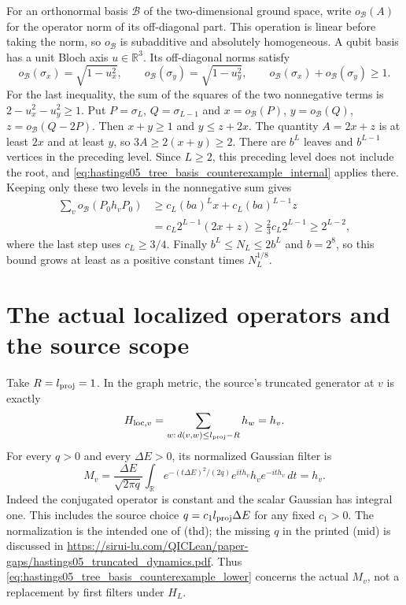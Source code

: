 \documentclass{article}
\begin{document}
For an orthonormal basis $\mathcal B$ of the two-dimensional ground space,
write $o_{\mathcal B}(A)$ for the operator norm of its off-diagonal part.
This operation is linear before taking the norm, so $o_{\mathcal B}$ is
subadditive and absolutely homogeneous. A qubit basis has a unit Bloch
axis $u\in\mathbb R^3$. Its off-diagonal norms satisfy
\[
 o_{\mathcal B}(\sigma_x)=\sqrt{1-u_x^2},\qquad
 o_{\mathcal B}(\sigma_y)=\sqrt{1-u_y^2},\qquad
 o_{\mathcal B}(\sigma_x)+o_{\mathcal B}(\sigma_y)\ge1.
\]
For the last inequality, the sum of the squares of the two nonnegative
terms is $2-u_x^2-u_y^2\ge1$.
Put $P=\sigma_L$, $Q=\sigma_{L-1}$ and
$x=o_{\mathcal B}(P)$, $y=o_{\mathcal B}(Q)$,
$z=o_{\mathcal B}(Q-2P)$. Then $x+y\ge1$ and $y\le z+2x$.
The quantity $A=2x+z$ is at least $2x$ and at least $y$, so
$3A\ge2(x+y)\ge2$.
There are $b^L$ leaves and $b^{L-1}$ vertices in the preceding level.
Since $L\ge2$, this preceding level does not include the root, and
\eqref{eq:hastings05_tree_basis_counterexample_internal} applies there.
Keeping only these two levels in the nonnegative sum gives
\begin{align*}
 \sum_v o_{\mathcal B}(P_0h_vP_0)
 &\ge c_L(ba)^Lx+c_L(ba)^{L-1}z\\
 &=c_L2^{L-1}(2x+z)
 \ge\frac23c_L2^{L-1}\ge2^{L-2},
\end{align*}
where the last step uses $c_L\ge3/4$.
Finally $b^L\le N_L\le2b^L$ and $b=2^8$, so this bound grows at least
as a positive constant times $N_L^{1/8}$.

\section{The actual localized operators and the source scope}

Take $R=l_{\rm proj}=1$. In the graph metric, the source's truncated
generator at $v$ is exactly
\[
 H_{{\rm loc},v}=\sum_{w:\,d(v,w)\le l_{\rm proj}-R}h_w=h_v.
\]
For every $q>0$ and every $\Delta E>0$, its normalized Gaussian filter is
\[
 M_v=\frac{\Delta E}{\sqrt{2\pi q}}
       \int_{\mathbb R}e^{-(t\Delta E)^2/(2q)}
           e^{ith_v}h_ve^{-ith_v}\,dt=h_v.
\]
Indeed the conjugated operator is constant and the scalar Gaussian has
integral one. This includes the source choice $q=c_1l_{\rm proj}\Delta E$
for any fixed $c_1>0$. The normalization is the intended one of (thd);
the missing $q$ in the printed (mid) is discussed in
\url{https://sirui-lu.com/QICLean/paper-gaps/hastings05_truncated_dynamics.pdf}.
Thus \eqref{eq:hastings05_tree_basis_counterexample_lower} concerns the
actual $M_v$, not a replacement by first filters under $H_L$.
\end{document}
